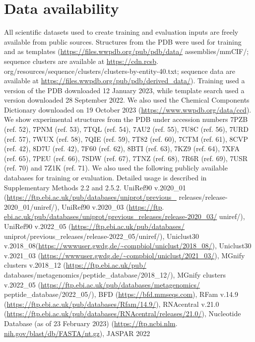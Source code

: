 \documentclass[10pt]{article}
\begin{document}
\section*{Data availability}
All scientific datasets used to create training and evaluation inputs are freely available from public sources. Structures from the PDB were used for training and as templates (\href{https://files.wwpdb.org/pub/pdb/data/}{https://files.wwpdb.org/pub/pdb/data/} assemblies/mmCIF/; sequence clusters are available at \href{https://cdn.rcsb}{https://cdn.rcsb}. org/resources/sequence/clusters/clusters-by-entity-40.txt; sequence data are available at \href{https://files.wwpdb.org/pub/pdb/derived_data/}{https://files.wwpdb.org/pub/pdb/derived\_data/}). Training used a version of the PDB downloaded 12 January 2023, while template search used a version downloaded 28 September 2022. We also used the Chemical Components Dictionary downloaded on 19 October 2023 (\href{https://www.wwpdb.org/data/ccd}{https://www.wwpdb.org/data/ccd}). We show experimental structures from the PDB under accession numbers 7PZB (ref. 52), 7PNM (ref. 53), 7TQL (ref. 54), 7AU2 (ref. 55), 7U8C (ref. 56), 7URD (ref. 57), 7WUX (ref. 58), 7QIE (ref. 59), 7T82 (ref. 60), 7CTM (ref. 61), 8CVP (ref. 42), 8D7U (ref. 42), 7F60 (ref. 62), 8BTI (ref. 63), 7KZ9 (ref. 64), 7XFA (ref. 65), 7PEU (ref. 66), 7SDW (ref. 67), 7TNZ (ref. 68), 7R6R (ref. 69), 7USR (ref. 70) and 7Z1K (ref. 71). We also used the following publicly available databases for training or evaluation. Detailed usage is described in Supplementary Methods 2.2 and 2.5.2. UniRef90 v.2020\_01 (\href{https://ftp.ebi.ac.uk/pub/databases/uniprot/previous_}{https://ftp.ebi.ac.uk/pub/databases/uniprot/previous\_} releases/release-2020\_01/uniref/), UniRef90 v.2020\_03 (\href{https://ftp}{https://ftp}. \href{http://ebi.ac.uk/pub/databases/uniprot/previous_releases/release-2020_03/}{ebi.ac.uk/pub/databases/uniprot/previous\_releases/release-2020\_03/} uniref/), UniRef90 v.2022\_05 (\href{https://ftp.ebi.ac.uk/pub/databases/}{https://ftp.ebi.ac.uk/pub/databases/} uniprot/previous\_releases/release-2022\_05/uniref/), Uniclust30 v.2018\_08(\href{https://wwwuser.gwdg.de/~compbiol/uniclust/2018_08/}{https://wwwuser.gwdg.de/\~{}compbiol/uniclust/2018\_08/}), Uniclust30 v.2021\_03 (\href{https://wwwuser.gwdg.de/~compbiol/uniclust/2021_03/}{https://wwwuser.gwdg.de/\~{}compbiol/uniclust/2021\_03/}), MGnify clusters v.2018\_12 (\href{https://ftp.ebi.ac.uk/pub/}{https://ftp.ebi.ac.uk/pub/} databases/metagenomics/peptide\_database/2018\_12/), MGnify clusters v.2022\_05 (\href{https://ftp.ebi.ac.uk/pub/databases/metagenomics/}{https://ftp.ebi.ac.uk/pub/databases/metagenomics/} peptide\_database/2022\_05/), BFD (\href{https://bfd.mmseqs.com}{https://bfd.mmseqs.com}), RFam v.14.9 (\href{https://ftp.ebi.ac.uk/pub/databases/Rfam/14.9/}{https://ftp.ebi.ac.uk/pub/databases/Rfam/14.9/}), RNAcentral v.21.0 (\href{https://ftp.ebi.ac.uk/pub/databases/RNAcentral/releases/21.0/}{https://ftp.ebi.ac.uk/pub/databases/RNAcentral/releases/21.0/}), Nucleotide Database (as of 23 February 2023) (\href{https://ftp.ncbi.nlm}{https://ftp.ncbi.nlm}. \href{http://nih.gov/blast/db/FASTA/nt.gz}{nih.gov/blast/db/FASTA/nt.gz}), JASPAR 2022 
\end{document}
